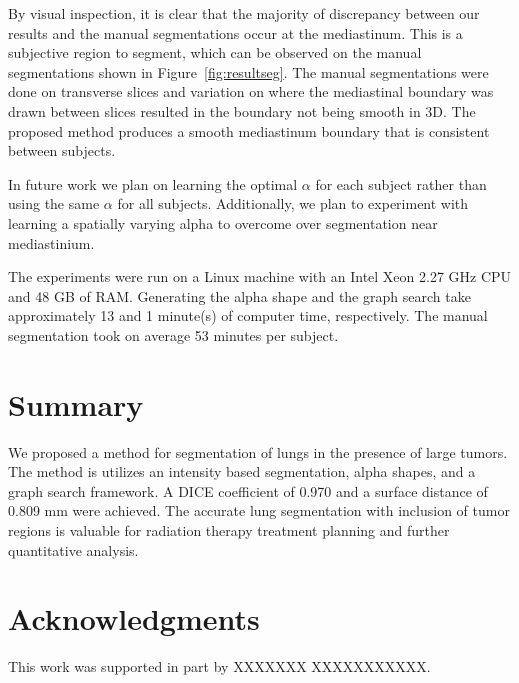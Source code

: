 \documentclass{llncs}
\begin{document}
By visual inspection, it is clear that the majority of discrepancy between our results and the manual segmentations occur at the mediastinum. This is a subjective region to segment, which can be observed on the manual segmentations shown in Figure~\ref{fig:resultseg}. The manual segmentations were done on transverse slices and variation on where the mediastinal boundary was drawn between slices resulted in the boundary not being smooth in 3D. The proposed method produces a smooth mediastinum boundary that is consistent between subjects. 

In future work we plan on learning the optimal $\alpha$ for each subject rather than using the same $\alpha$ for all subjects. Additionally, we plan to experiment with learning a spatially varying alpha to overcome over segmentation near mediastinium.

The experiments were run on a Linux machine with an Intel Xeon 2.27 GHz CPU and 48 GB of RAM. Generating the alpha shape and the graph search take approximately 13 and 1 minute(s) of computer time, respectively. The manual segmentation took on average 53 minutes per subject.
%
\section{Summary}
%
We proposed a method for segmentation of lungs in the presence of large tumors. The method is utilizes an intensity based segmentation, alpha shapes, and a graph search framework. A DICE coefficient of 0.970 and a surface distance of 0.809 mm were achieved. The accurate lung segmentation with  inclusion of tumor regions is valuable for radiation therapy treatment planning and further quantitative analysis.
%

\section{Acknowledgments}
%
This work was supported in part by 
XXXXXXX XXXXXXXXXXX.


%
%









\clearpage
{} %
\renewcommand{\indexname}{Author Index}
\printindex
\clearpage

\end{document}
